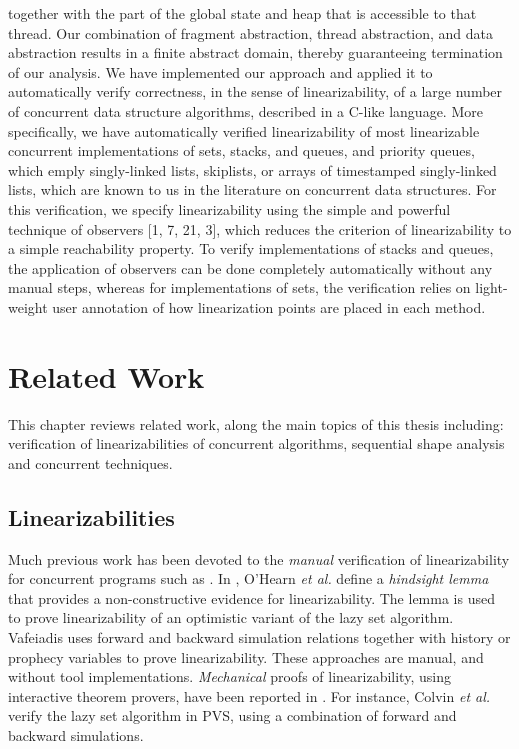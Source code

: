 together with the part of the global state and heap that is accessible to that thread. Our
combination of fragment abstraction, thread abstraction, and data abstraction results in
a finite abstract domain, thereby guaranteeing termination of our analysis.
We have implemented our approach and applied it to automatically verify correctness, in the sense of linearizability, of a large number of concurrent data structure
algorithms, described in a C-like language. More specifically, we have automatically
verified linearizability of most linearizable concurrent implementations of sets, stacks,
and queues, and priority queues, which emply singly-linked lists, skiplists, or arrays
of timestamped singly-linked lists, which are known to us in the literature on concurrent data structures. For this verification, we specify linearizability using the simple and
powerful technique of observers [1, 7, 21, 3], which reduces the criterion of linearizability to a simple reachability property. To verify implementations of stacks and queues,
the application of observers can be done completely automatically without any manual
steps, whereas for implementations of sets, the verification relies on light-weight user
annotation of how linearization points are placed in each method. 

\section{Related Work}
This chapter reviews related work, along the main topics of this thesis including: verification of linearizabilities of concurrent algorithms, 
sequential shape analysis and concurrent techniques.
\subsection{Linearizabilities}
Much previous work has been devoted to
the {\it manual} verification of linearizability for
concurrent programs such as \cite{Aaron:locigcal:linearizability}.
In \cite{OHearnlist}, O'Hearn {\it et al.}  define a
{\it hindsight lemma} that
provides a non-constructive evidence for linearizability. 
%
The lemma is used to prove linearizability of an optimistic variant of 
the lazy set algorithm.
Vafeiadis \cite{Vafeiadis:Thesis}
uses forward and backward simulation relations together
with history or prophecy variables to prove linearizability.
%
These approaches are manual, and without
tool implementations.
{\it Mechanical} proofs of linearizability, using interactive theorem
provers, have been reported in 
\cite{Colvin:Lazy-List,Derrick:fm14,SWD:cav12,SDW:tcl14}.
%
For instance, Colvin {\it et al.} \cite{Colvin:Lazy-List}
verify the lazy set algorithm in  PVS,
using a combination of forward and backward simulations.

